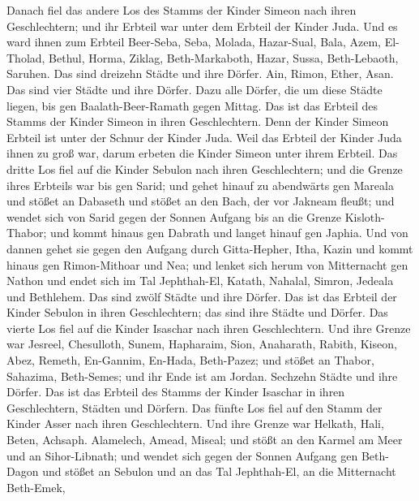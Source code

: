  Danach fiel das andere Los des Stamms der Kinder Simeon
nach ihren Geschlechtern; und ihr Erbteil war unter dem Erbteil der
Kinder Juda.  Und es ward ihnen zum Erbteil Beer-Seba, Seba,
Molada,  Hazar-Sual, Bala, Azem,  El-Tholad,
Bethul, Horma,  Ziklag, Beth-Markaboth, Hazar, Sussa,
 Beth-Lebaoth, Saruhen. Das sind dreizehn Städte und ihre
Dörfer.  Ain, Rimon, Ether, Asan. Das sind vier Städte und
ihre Dörfer.  Dazu alle Dörfer, die um diese Städte liegen,
bis gen Baalath-Beer-Ramath gegen Mittag. Das ist das Erbteil des Stamms
der Kinder Simeon in ihren Geschlechtern.  Denn der Kinder
Simeon Erbteil ist unter der Schnur der Kinder Juda. Weil das Erbteil
der Kinder Juda ihnen zu groß war, darum erbeten die Kinder Simeon unter
ihrem Erbteil.  Das dritte Los fiel auf die Kinder Sebulon
nach ihren Geschlechtern; und die Grenze ihres Erbteils war bis gen
Sarid;  und gehet hinauf zu abendwärts gen Mareala und
stößet an Dabaseth und stößet an den Bach, der vor Jakneam fleußt;
 und wendet sich von Sarid gegen der Sonnen Aufgang bis an
die Grenze Kisloth-Thabor; und kommt hinaus gen Dabrath und langet
hinauf gen Japhia.  Und von dannen gehet sie gegen den
Aufgang durch Gitta-Hepher, Itha, Kazin und kommt hinaus gen
Rimon-Mithoar und Nea;  und lenket sich herum von
Mitternacht gen Nathon und endet sich im Tal Jephthah-El, 
Katath, Nahalal, Simron, Jedeala und Bethlehem. Das sind zwölf Städte
und ihre Dörfer.  Das ist das Erbteil der Kinder Sebulon in
ihren Geschlechtern; das sind ihre Städte und Dörfer.  Das
vierte Los fiel auf die Kinder Isaschar nach ihren Geschlechtern.
 Und ihre Grenze war Jesreel, Chesulloth, Sunem,
 Hapharaim, Sion, Anaharath,  Rabith, Kiseon,
Abez,  Remeth, En-Gannim, En-Hada, Beth-Pazez;
 und stößet an Thabor, Sahazima, Beth-Semes; und ihr Ende
ist am Jordan. Sechzehn Städte und ihre Dörfer.  Das ist
das Erbteil des Stamms der Kinder Isaschar in ihren Geschlechtern,
Städten und Dörfern.  Das fünfte Los fiel auf den Stamm der
Kinder Asser nach ihren Geschlechtern.  Und ihre Grenze war
Helkath, Hali, Beten, Achsaph.  Alamelech, Amead, Miseal;
und stößt an den Karmel am Meer und an Sihor-Libnath;  und
wendet sich gegen der Sonnen Aufgang gen Beth-Dagon und stößet an
Sebulon und an das Tal Jephthah-El, an die Mitternacht Beth-Emek,

